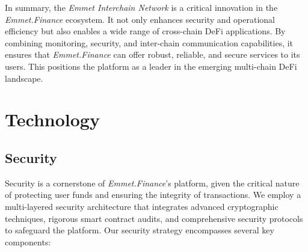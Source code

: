 \documentclass[12pt, a4paper]{article}
\begin{document}
In summary, the \textit{Emmet Interchain Network} is a critical innovation in the \textit{Emmet.Finance} ecosystem. It not only enhances security and operational efficiency but also enables a wide range of cross-chain DeFi applications. By combining monitoring, security, and inter-chain communication capabilities, it ensures that \textit{Emmet.Finance} can offer robust, reliable, and secure services to its users. This positions the platform as a leader in the emerging multi-chain DeFi landscape.


\section{Technology}

\subsection{Security}

Security is a cornerstone of \textit{Emmet.Finance}'s platform, given the critical nature of protecting user funds and ensuring the integrity of transactions. We employ a multi-layered security architecture that integrates advanced cryptographic techniques, rigorous smart contract audits, and comprehensive security protocols to safeguard the platform. Our security strategy encompasses several key components:
\end{document}
